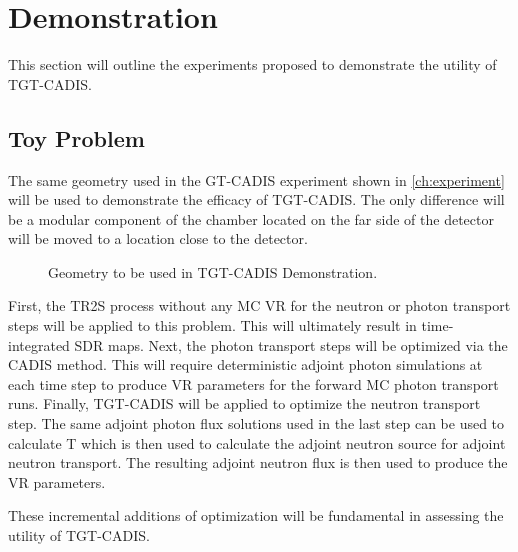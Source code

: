 \section{Demonstration} \label{sec:demo}
This section will outline the experiments proposed to demonstrate the utility
of TGT-CADIS.  

\subsection{Toy Problem}
The same geometry used in the GT-CADIS experiment shown in \ref{ch:experiment}
will be used to demonstrate the efficacy of TGT-CADIS.  The only difference
will be a modular component of the chamber located on the far side of the
detector will be moved to a location close to the detector.  

\begin{figure} \label{fig:mov_geom}
    \caption [Geometry for TGT-CADIS Demonstration]
	{Geometry to be used in TGT-CADIS Demonstration.}
\end{figure}
{}

First, the TR2S process without any MC VR for the neutron or photon transport
steps will be applied to this problem.  This will ultimately result in
time-integrated SDR maps.
Next, the photon transport steps will be optimized via the CADIS method.  This
will require deterministic adjoint photon simulations at each time step to
produce VR parameters for the forward MC photon transport runs.
Finally, TGT-CADIS will be applied to optimize the neutron transport step.  The
same adjoint photon flux solutions used in the last step can be used to
calculate T which is then used to calculate the adjoint neutron source for
adjoint neutron transport. The resulting adjoint neutron flux is then used to
produce the VR parameters.

These incremental additions of optimization will be fundamental in assessing the
utility of TGT-CADIS. 



